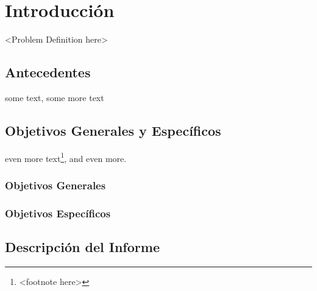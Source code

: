 \chapter{Introducción}
<Problem Definition here>

\section{Antecedentes}
some text\cite{citation-1-name-here}, some more text

\section{Objetivos Generales y Específicos}
even more text\footnote{<footnote here>}, and even more.
\subsection{Objetivos Generales}
\subsection{Objetivos Específicos}

\section{Descripción del Informe}
